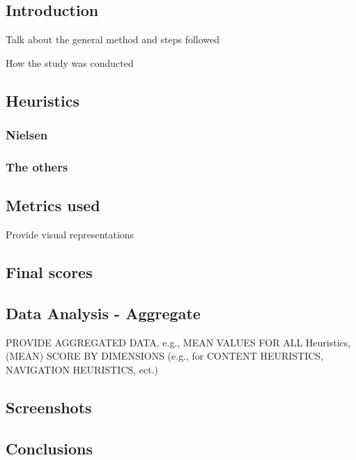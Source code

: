\subsection{Introduction}
Talk about the general method and steps followed

How the study was conducted

\subsection{Heuristics}

\subsubsection{Nielsen}
\subsubsection{The others}

\subsection{Metrics used}
Provide visual representations

\subsection{Final scores}

\subsection{Data Analysis - Aggregate}
PROVIDE AGGREGATED DATA, e.g., MEAN VALUES FOR ALL Heuristics,
(MEAN) SCORE BY DIMENSIONS (e.g., for CONTENT HEURISTICS,
NAVIGATION HEURISTICS, ect.)

\subsection{Screenshots}

\subsection{Conclusions}

